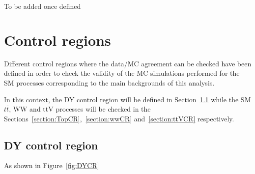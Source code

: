 \documentclass[a4paper, 10pt, openright]{report}
\begin{document}
\color{red}To be added once defined \color{black}

\section{Control regions} \label{section:CR}

Different control regions where the data/\ac{MC} agreement can be checked have been defined in order to check the validity of the \ac{MC} simulations performed for the \ac{SM} processes corresponding to the main backgrounds of this analysis. 

In this context, the \ac{DY} control region will be defined in Section~\ref{section:DYCR} while the \ac{SM} $t \bar t$, WW and ttV processes will be checked in the Sections~\ref{section:TopCR},~\ref{section:wwCR} and~\ref{section:ttVCR} respectively.

\subsection{\ac{DY} control region} \label{section:DYCR}


As shown in Figure~\ref{fig:DYCR}
\end{document}
